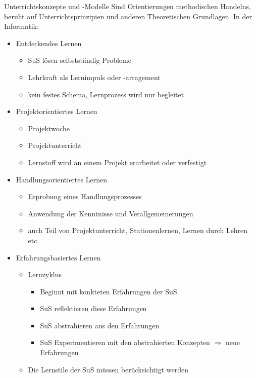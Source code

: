 \documentclass{article}
\begin{document}
\begin{block}{Unterrichtskonzepte und -Modelle}
    Sind Orientierungen methodischen Handelns, beruht auf Unterrichtsprinzipien und anderen Theoretischen Grundlagen.
    In der Informatik:
    \begin{itemize}
        \item Entdeckendes Lernen
        \begin{itemize}
            \item SuS lösen selbstständig Probleme
            \item Lehrkraft als Lernimpuls oder -arragement
            \item kein festes Schema, Lernprozess wird nur begleitet
        \end{itemize}
        \item Projektorientiertes Lernen
        \begin{itemize}
            \item Projektwoche
            \item Projektunterricht
            \item Lernstoff wird an einem Projekt erarbeitet oder verfestigt
        \end{itemize}
        \item Handlungsorientiertes Lernen
        \begin{itemize}
            \item Erprobung eines Handlungsprozesses
            \item Anwendung der Kenntnisse und Verallgemeinerungen
            \item auch Teil von Projektunterricht, Stationenlernen, Lernen durch Lehren etc.
        \end{itemize}
        \item Erfahrungsbasiertes Lernen
        \begin{itemize}
            \item Lernzyklus
            \begin{itemize}
                \item Beginnt mit konkteten Erfahrungen der SuS
                \item SuS reflektieren diese Erfahrungen
                \item SuS abstrahieren aus den Erfahrungen
                \item SuS Experimentieren mit den abstrahierten Konzepten $\Rightarrow$ neue Erfahrungen
            \end{itemize}
            \item Die Lernstile der SuS müssen berücksichtigt werden

\end{itemize}
\end{itemize}
\end{block}
\end{document}

